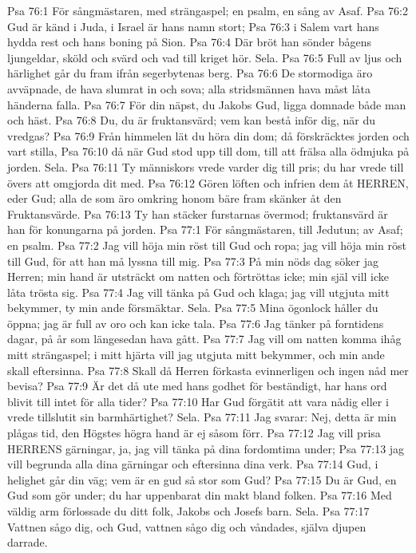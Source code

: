 Psa 76:1  För sångmästaren, med strängaspel; en psalm, en sång av Asaf.
Psa 76:2  Gud är känd i Juda, i Israel är hans namn stort;
Psa 76:3  i Salem vart hans hydda rest och hans boning på Sion.
Psa 76:4  Där bröt han sönder bågens ljungeldar, sköld och svärd och vad till kriget hör. Sela.
Psa 76:5  Full av ljus och härlighet går du fram ifrån segerbytenas berg.
Psa 76:6  De stormodiga äro avväpnade, de hava slumrat in och sova; alla stridsmännen hava måst låta händerna falla.
Psa 76:7  För din näpst, du Jakobs Gud, ligga domnade både man och häst.
Psa 76:8  Du, du är fruktansvärd; vem kan bestå inför dig, när du vredgas?
Psa 76:9  Från himmelen lät du höra din dom; då förskräcktes jorden och vart stilla,
Psa 76:10  då när Gud stod upp till dom, till att frälsa alla ödmjuka på jorden. Sela.
Psa 76:11  Ty människors vrede varder dig till pris; du har vrede till övers att omgjorda dit med.
Psa 76:12  Gören löften och infrien dem åt HERREN, eder Gud; alla de som äro omkring honom bäre fram skänker åt den Fruktansvärde.
Psa 76:13  Ty han stäcker furstarnas övermod; fruktansvärd är han för konungarna på jorden.
Psa 77:1  För sångmästaren, till Jedutun; av Asaf; en psalm.
Psa 77:2  Jag vill höja min röst till Gud och ropa; jag vill höja min röst till Gud, för att han må lyssna till mig.
Psa 77:3  På min nöds dag söker jag Herren; min hand är utsträckt om natten och förtröttas icke; min själ vill icke låta trösta sig.
Psa 77:4  Jag vill tänka på Gud och klaga; jag vill utgjuta mitt bekymmer, ty min ande försmäktar. Sela.
Psa 77:5  Mina ögonlock håller du öppna; jag är full av oro och kan icke tala.
Psa 77:6  Jag tänker på forntidens dagar, på år som längesedan hava gått.
Psa 77:7  Jag vill om natten komma ihåg mitt strängaspel; i mitt hjärta vill jag utgjuta mitt bekymmer, och min ande skall eftersinna.
Psa 77:8  Skall då Herren förkasta evinnerligen och ingen nåd mer bevisa?
Psa 77:9  Är det då ute med hans godhet för beständigt, har hans ord blivit till intet för alla tider?
Psa 77:10  Har Gud förgätit att vara nådig eller i vrede tillslutit sin barmhärtighet? Sela.
Psa 77:11  Jag svarar: Nej, detta är min plågas tid, den Högstes högra hand är ej såsom förr.
Psa 77:12  Jag vill prisa HERRENS gärningar, ja, jag vill tänka på dina fordomtima under;
Psa 77:13  jag vill begrunda alla dina gärningar och eftersinna dina verk.
Psa 77:14  Gud, i helighet går din väg; vem är en gud så stor som Gud?
Psa 77:15  Du är Gud, en Gud som gör under; du har uppenbarat din makt bland folken.
Psa 77:16  Med väldig arm förlossade du ditt folk, Jakobs och Josefs barn. Sela.
Psa 77:17  Vattnen sågo dig, och Gud, vattnen sågo dig och våndades, själva djupen darrade.
